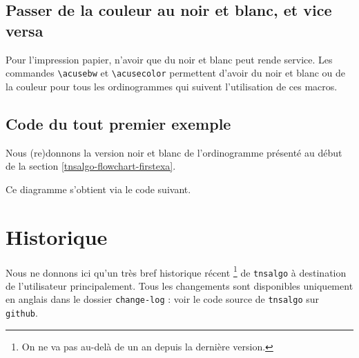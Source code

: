 \documentclass[12pt,a4paper]{article}
\theoremstyle{definition}
\begin{document}
\subsection{Passer de la couleur au noir et blanc, et vice versa} \label{tnsalgo-bw-mode}

Pour l'impression papier, n'avoir que du noir et blanc peut rende service. Les commandes \verb+\acusebw+ et \verb+\acusecolor+ permettent d'avoir du noir et blanc ou de la couleur pour tous les ordinogrammes qui suivent l'utilisation de ces macros.


\subsection{Code du tout premier exemple} \label{tnsalgo-flowchart-firstexa-code}

Nous (re)donnons la version noir et blanc de l'ordinogramme présenté au début de la section \ref{tnsalgo-flowchart-firstexa}.

\acusebw
\begin{center}
    \small
    
\end{center}
\acusecolor

Ce diagramme s'obtient via le code suivant.


\newpage

\section{Historique}

Nous ne donnons ici qu'un très bref historique récent
\footnote{
	On ne va pas au-delà de un an depuis la dernière version.
}
de \verb+tnsalgo+ à destination de l'utilisateur principalement.
Tous les changements sont disponibles uniquement en anglais dans le dossier \verb+change-log+ : voir le code source de \verb+tnsalgo+ sur \verb+github+.
\end{document}
